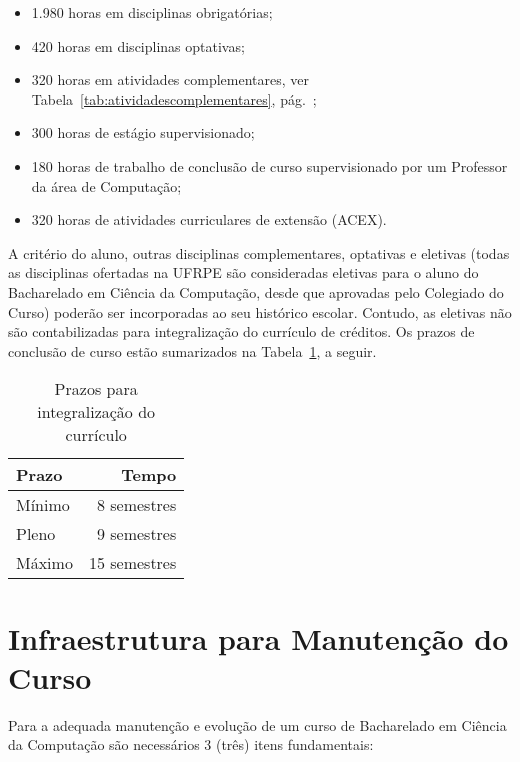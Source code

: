 \documentclass[
	12pt,				%
	openright,			%
  oneside,     %
	a4paper,			%
	english,			%
	french,				%
	spanish,			%
	brazil				%
	]{abntex2}
\begin{document}
\begin{itemize}
  \item 1.980 horas em disciplinas obrigatórias;
  \item 420 horas em disciplinas optativas;
  \item 320 horas em atividades complementares, ver Tabela~\ref{tab:atividadescomplementares}, pág.~\pageref{tab:atividadescomplementares};
  \item 300 horas de estágio supervisionado;
  \item 180 horas de trabalho de conclusão de curso supervisionado por um Professor da área de Computação;
  \item 320 horas de atividades curriculares de extensão (ACEX).

\end{itemize}

A critério do aluno, outras disciplinas complementares, optativas e eletivas (todas as disciplinas ofertadas na UFRPE são consideradas eletivas para o aluno do Bacharelado em Ciência da Computação, desde que aprovadas pelo Colegiado do Curso) poderão ser incorporadas ao seu histórico escolar. Contudo, as eletivas não são contabilizadas para integralização do currículo de créditos. Os prazos de conclusão de curso estão sumarizados na Tabela~\ref{tab:prazoCurriculo}, a seguir. 

\begin{table}[htbp]
  \centering
  \caption{Prazos para integralização do currículo}
    \begin{tabular}{l|r}
\hline
    \textbf{Prazo} & \textbf{Tempo} \\ \hline 
    Mínimo & 8 semestres \\ \hline
    Pleno & 9 semestres \\ \hline
    Máximo & 15 semestres \\ \hline

    \end{tabular}%
  \label{tab:prazoCurriculo}%
\end{table}%


\section{Infraestrutura para Manutenção do Curso}

Para a adequada manutenção e evolução de um curso de Bacharelado em Ciência da
Computação são necessários 3 (três) itens fundamentais:
\end{document}
